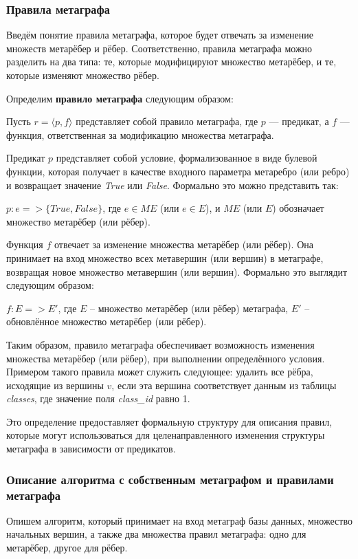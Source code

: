 \subsubsection{Правила метаграфа}
Введём понятие правила метаграфа, которое будет отвечать за изменение множеств метарёбер и рёбер. Соответственно, правила метаграфа можно разделить на два типа: те, которые модифицируют множество метарёбер, и те, которые изменяют множество рёбер.

Определим \textbf{правило метаграфа} следующим образом:

Пусть $r = \langle p, f \rangle$ представляет собой правило метаграфа, где $p$ — предикат, а $f$ — функция, ответственная за модификацию множества метаграфа.

Предикат $p$ представляет собой условие, формализованное в виде булевой функции, которая получает в качестве входного параметра метаребро (или ребро) и возвращает значение \textit{True} или \textit{False}. Формально это можно представить так:

$p: e => \{True, False\}$, где $e \in ME$ (или $e \in E$), и $ME$ (или $E$) обозначает множество метарёбер (или рёбер).

Функция $f$ отвечает за изменение множества метарёбер (или рёбер). Она принимает на вход множество всех метавершин (или вершин) в метаграфе, возвращая новое множество метавершин (или вершин). Формально это выглядит следующим образом:

$f: E => E'$, где $E$ -- множество метарёбер (или рёбер) метаграфа, $E'$ -- обновлённое множество метарёбер (или рёбер).

Таким образом, правило метаграфа обеспечивает возможность изменения множества метарёбер (или рёбер), при выполнении определённого условия. Примером такого правила может служить следующее: удалить все рёбра, исходящие из вершины $v$, если эта вершина соответствует данным из таблицы \textit{classes}, где значение поля \textit{class\_id} равно 1.

Это определение предоставляет формальную структуру для описания правил, которые могут использоваться для целенаправленного изменения структуры метаграфа в зависимости от предикатов.

\subsubsection{Описание алгоритма с собственным метаграфом и правилами метаграфа}
Опишем алгоритм, который принимает на вход метаграф базы данных, множество начальных вершин, а также два множества правил метаграфа: одно для метарёбер, другое для рёбер.

